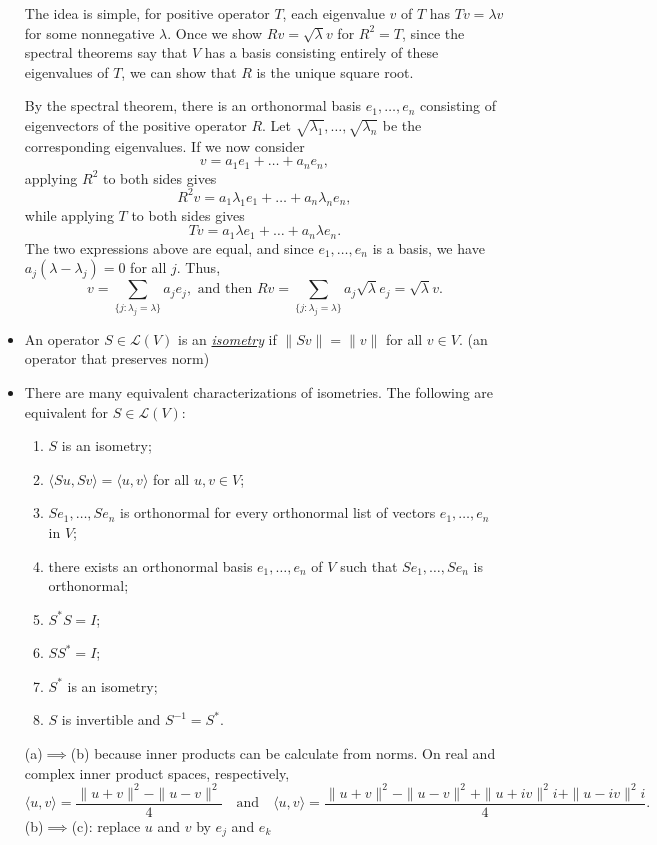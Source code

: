 \documentclass{article}
\newcommand{\df}[1]{\ul{\textit{#1}}}
\newcommand{\inp}[2]{\langle #1, #2 \rangle}
\newcommand{\nm}[1]{\| #1 \|}
\newcommand{\LV}{\mathcal{L}(V)}
\begin{document}
\begin{itemize}
    The idea is simple, for positive operator $T$, each eigenvalue $v$ of $T$ has $Tv = \lambda v$ for some nonnegative $\lambda$. Once we show $Rv = \sqrt{\lambda}v$ for $R^2=T$, since the spectral theorems say that $V$ has a basis consisting entirely of these eigenvalues of $T$, we can show that $R$ is the unique square root.
    
    By the spectral theorem, there is an orthonormal basis $e_1,\dots,e_n$ consisting of eigenvectors of the positive operator $R$. Let $\sqrt{\lambda_1},\dots,\sqrt{\lambda_n}$ be the corresponding eigenvalues. If we now consider 
    $$v = a_1 e_1+\dots+a_ne_n,$$ applying $R^2$ to both sides gives $$R^2v = a_1 \lambda_1 e_1 + \dots + a_n \lambda_n e_n,$$ while applying $T$ to both sides gives 
    $$Tv = a_1 \lambda e_1 +\dots+ a_n \lambda e_n.$$ The two expressions above are equal, and since $e_1,\dots,e_n$ is a basis, we have $a_j(\lambda - \lambda_j) = 0$ for all $j$. Thus, 
    $$v = \sum_{\{j: \lambda_j=\lambda\}}a_j e_j, \text{ and then } Rv = \sum_{\{j: \lambda_j=\lambda\}} a_j \sqrt{\lambda} e_j = \sqrt{\lambda}v.$$
    
    \item An operator $S \in \LV$ is an \df{isometry} if $\nm{Sv}=\nm{v}$ for all $v \in V$. (an operator that preserves norm)
    \item There are many equivalent characterizations of isometries. The following are equivalent for $S \in \LV$:
    \begin{enumerate}[label=(\alph*)]
    \item $S$ is an isometry;
    \item $\inp{Su}{Sv} = \inp{u}{v}$ for all $u,v \in V$;
    \item $Se_1,\dots,Se_n$ is orthonormal for every orthonormal list of vectors $e_1,\dots,e_n$ in $V$;
    \item there exists an orthonormal basis $e_1,\dots,e_n$ of $V$ such that $Se_1,\dots,Se_n$ is orthonormal;
    \item $S^*S = I$;
    \item $SS^* = I$;
    \item $S^*$ is an isometry;
    \item $S$ is invertible and $S^{-1} = S^*$.
    \end{enumerate}
    
    (a)$\implies$(b) because inner products can be calculate from norms. On real and complex inner product spaces, respectively,
    \begin{equation*}
        \inp{u}{v} = \frac{\nm{u+v}^2-\nm{u-v}^2}{4} \quad \text{and} \quad \inp{u}{v} = \frac{\nm{u+v}^2-\nm{u-v}^2+\nm{u+iv}^2i+\nm{u-iv}^2i}{4}.
    \end{equation*}
    (b)$\implies$(c): replace $u$ and $v$ by $e_j$ and $e_k$
    

\end{itemize}
\end{document}
